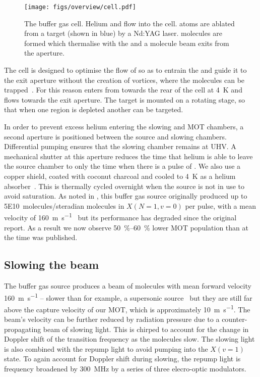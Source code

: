 \begin{figure}
  \centering
  \texttt{[image: figs/overview/cell.pdf]}
  \caption[The buffer gas cell]{
    The buffer gas cell. Helium and \SFsix flow into the cell. \Ca{}
  atoms are ablated from a target (shown in blue) by a Nd:YAG laser. \CaF{} molecules are
formed which thermalise with the \He{} and a molecule beam exits from the aperture.}
  \label{overview:fig:source}
\end{figure}

The cell is designed to optimise the flow of \He{} so as to entrain the 
\CaF{} and guide it to the exit aperture without the creation of vortices,
where the molecules can be trapped~\cite{Truppe2018}. For this reason \He{}
enters from towards the rear of the cell at \SI{4}{\kelvin} and flows towards
the exit aperture.  The \Ca{} target is  mounted on a rotating stage, so that
when one region is depleted another can be targeted.

In order to prevent excess helium entering the slowing and MOT chambers, a
second aperture is positioned between the source and slowing chambers.
Differential pumping ensures that the slowing chamber remains at UHV. A
mechanical shutter at this aperture reduces the time that helium is able to
leave the source chamber to only the time when there is a pulse of \CaF{}. We
also use a copper shield, coated with coconut charcoal and cooled to
\SI{4}{\kelvin} as a helium absorber~\cite{doi:10.1116/1.574141}. This is
thermally cycled overnight when the source is not in use to avoid saturation.
As noted in , this buffer gas source originally
produced up to \SI{5E10}{molecules/steradian} molecules in $X(N=1, v=0)$ per
pulse, with a
mean velocity of \SI{160}{\meter\per\second}~\cite{Truppe2018} but its
performance has degraded since the original report. As a result we now observe
\SIrange{50}{60}{\percent} lower MOT population than at the time
 was published.

\subsection{Slowing the beam}

The buffer gas source produces a beam of molecules with mean forward velocity
\SI{160}{\meter\per\second} -- slower than for example, a supersonic
source~\cite{Mathavan2016} but they are still far above the capture velocity of
our MOT, which is approximately \SI{10}{\meter\per\second}. The beam's velocity
can be further reduced by radiation pressure due to a counter-propagating beam
of  slowing light. This is chirped to account for the change in
Doppler shift of the transition frequency as the molecules slow. The slowing
light is also combined with the  repump light to avoid pumping
into the $X(v=1)$ state. To again account for Doppler shift during slowing, the
repump light is frequency broadened by \SI{300}{\mega\hertz} by a series of
three elecro-optic modulators.


